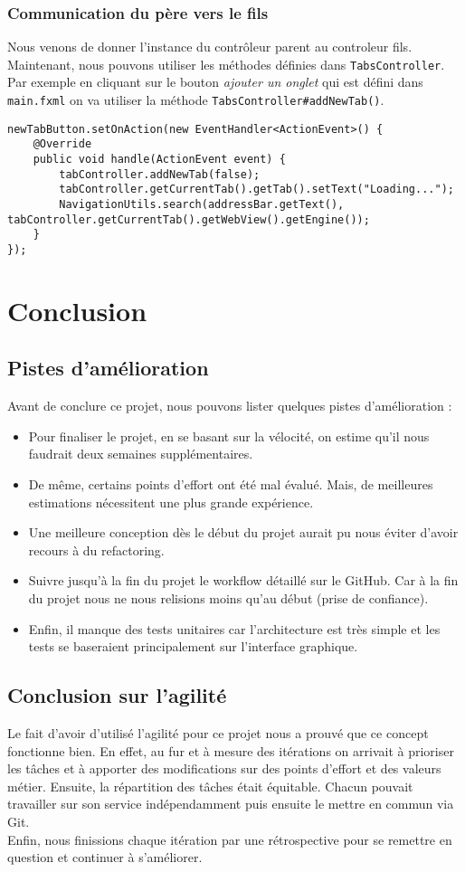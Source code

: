 \documentclass[10pt,a4paper]{article}
\begin{document}
\subsubsection{Communication du père vers le fils}

Nous venons de donner l'instance du contrôleur parent au controleur fils. Maintenant, nous pouvons utiliser les méthodes définies dans \verb|TabsController|. Par exemple en cliquant sur le bouton \textit{ajouter un onglet} qui est défini dans \verb|main.fxml| on va utiliser la méthode \verb|TabsController#addNewTab()|. 
\begin{lstlisting}
newTabButton.setOnAction(new EventHandler<ActionEvent>() {
	@Override
	public void handle(ActionEvent event) {
		tabController.addNewTab(false);
    	tabController.getCurrentTab().getTab().setText("Loading...");
		NavigationUtils.search(addressBar.getText(), tabController.getCurrentTab().getWebView().getEngine());
	}
});
\end{lstlisting}


\section{Conclusion}
\subsection{Pistes d'amélioration}

Avant de conclure ce projet, nous pouvons lister quelques pistes d'amélioration :
\begin{itemize}
\item Pour finaliser le projet, en se basant sur la vélocité, on estime qu'il nous faudrait deux semaines supplémentaires.
\item De même, certains points d'effort ont été mal évalué. Mais, de meilleures estimations nécessitent une plus grande expérience. 
\item Une meilleure conception dès le début du projet aurait pu nous éviter d'avoir recours à du refactoring.
\item Suivre jusqu'à la fin du projet le workflow détaillé sur le GitHub. Car à la fin du projet nous ne nous relisions moins qu'au début (prise de confiance).
\item Enfin, il manque des tests unitaires car l'architecture est très simple et les tests se baseraient principalement sur l'interface graphique.
\end{itemize}

\subsection{Conclusion sur l'agilité}
Le fait d'avoir d'utilisé l'agilité pour ce projet nous a prouvé que ce concept fonctionne bien. En effet, au fur et à mesure des itérations on arrivait à prioriser les tâches et à apporter des modifications sur des points d'effort et des valeurs métier. Ensuite, la répartition des tâches était équitable. Chacun pouvait travailler sur son service indépendamment puis ensuite le mettre en commun via Git. \\
Enfin, nous finissions chaque itération par une rétrospective pour se remettre en question et continuer à s'améliorer.
\end{document}
